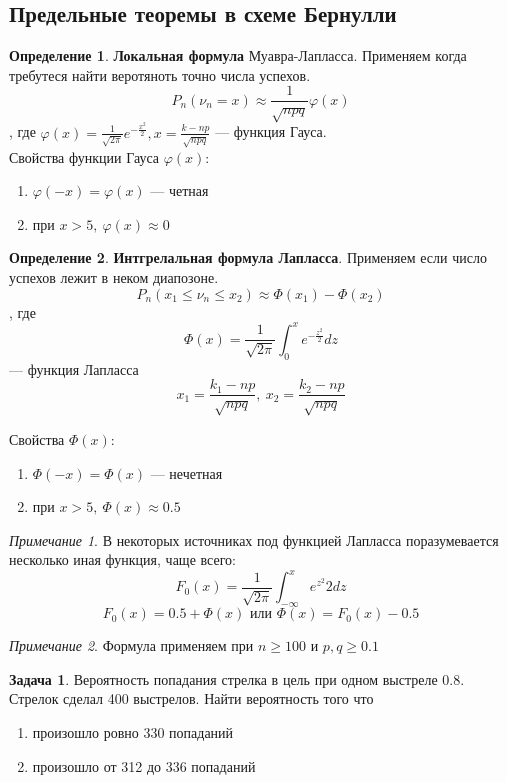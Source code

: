 \documentclass[oneside]{book}
\theoremstyle{plain}
\theoremstyle{remark}
\newtheorem*{remark}{Примечание}
\theoremstyle{definition}
\newtheorem{task}{Задача}
\newtheorem*{definition}{Определение}
\begin{document}
\subsection{Предельные теоремы в схеме Бернулли}
\label{sec:org12fce19}
\begin{definition}
\textbf{Локальная формула} Муавра-Лапласса. Применяем когда требутеся найти веротяноть точно числа успехов.
\[ P_n(\nu_n = x) \approx \frac{1}{\sqrt{npq}}\varphi(x) \]
, где \(\varphi(x) = \frac{1}{\sqrt{2\pi}}e^{-\frac{x^2}{2}}, x = \frac{k - np}{\sqrt{npq}}\) --- функция Гауса. \\
Свойства функции Гауса \(\varphi(x)\):
\begin{enumerate}
\item \(\varphi(-x) = \varphi(x)\) --- четная
\item при \(x > 5,\ \varphi(x) \approx 0\)
\end{enumerate}
\end{definition}
\begin{definition}
\textbf{Интгрелальная формула Лапласса}. Применяем если число успехов лежит в неком диапозоне.
\[ P_n(x_1 \le \nu_n \le x_2) \approx \Phi(x_1) - \Phi(x_2) \]
, где \[ \Phi(x) = \frac{1}{\sqrt{2\pi}} \int_0^x e^{-\frac{z^2}{2}} dz\] --- функция Лапласса \\
\[ x_1 = \frac{k_1 - np}{\sqrt{npq}},\ x_2 = \frac{k_2 - np}{\sqrt{npq}} \]

Свойства \(\Phi(x)\):
\begin{enumerate}
\item \(\Phi(-x) = \Phi(x)\) --- нечетная
\item при \(x > 5,\ \Phi(x) \approx 0.5\)
\end{enumerate}
\end{definition}
\begin{remark}
В некоторых источниках под функцией Лапласса поразумевается несколько иная функция, чаще всего:
\[ F_0(x) = \frac{1}{\sqrt{2\pi}} \int_{-\infty}^x e^{z^2}{2}dz \]
\[ F_0(x) = 0.5 + \Phi(x)\text{ или }\Phi(x) = F_0(x)-0.5 \]
\end{remark}
\begin{remark}
Формула применяем при \(n \ge 100\) и \(p,q\ge0.1\) 
\end{remark}
\begin{task}
Вероятность попадания стрелка в цель при одном выстреле 0.8. Стрелок сделал 400 выстрелов. Найти вероятность того что
\begin{enumerate}
\item произошло ровно 330 попаданий
\item произошло от 312 до 336 попаданий
\end{enumerate}
\end{task}
\end{document}
